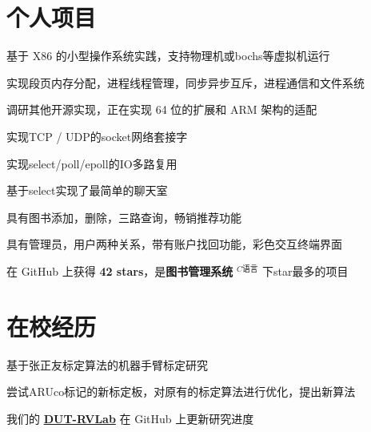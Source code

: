\documentclass[]{deedy-resume-openfont}
\begin{document}
\begin{minipage}[t]{0.73\textwidth} 


\section{个人项目}
\sectionsep
{}
\vspace{\topsep}
\begin{tightemize}
    \item 基于 X86 的小型操作系统实践，支持物理机或bochs等虚拟机运行
    \item 实现段页内存分配，进程线程管理，同步异步互斥，进程通信和文件系统
    \item 调研其他开源实现，正在实现 64 位的扩展和 ARM 架构的适配
    \end{tightemize}
\sectionsep

\begin{tightemize}
    \item 实现TCP / UDP的socket网络套接字
    \item 实现select/poll/epoll的IO多路复用
    \item 基于select实现了最简单的聊天室
    \end{tightemize}
\sectionsep

\begin{tightemize}
    \item 具有图书添加，删除，三路查询，畅销推荐功能
    \item 具有管理员，用户两种关系，带有账户找回功能，彩色交互终端界面
    \item 在 GitHub 上获得 \textbf{42 stars}，是\textbf{图书管理系统} $^{C语言}$ 下star最多的项目
    \end{tightemize}
\sectionsep


\section{在校经历}
\sectionsep
{}
\begin{tightemize}
    \item 基于张正友标定算法的机器手臂标定研究
    \item 尝试ARUco标记的新标定板，对原有的标定算法进行优化，提出新算法
    \item 我们的 \href{https://github.com/DUT-RVLab}{\bf DUT-RVLab} 在 GitHub 上更新研究进度
    \end{tightemize}
\sectionsep


\end{minipage}
\end{document}
